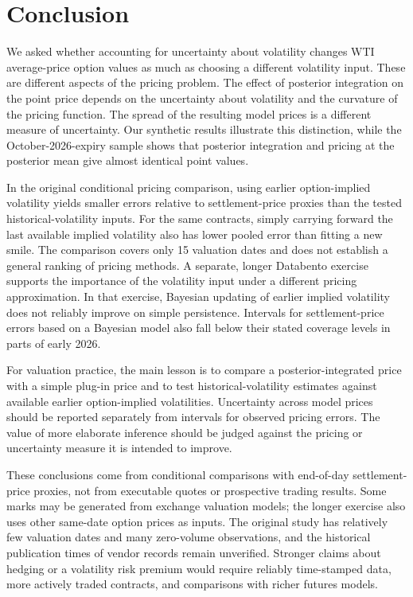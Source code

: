 \section{Conclusion}\label{sec:short_conclusion}

We asked whether accounting for uncertainty about volatility changes
WTI average-price option values as much as choosing a different
volatility input. These are different aspects of the pricing problem. The effect of posterior integration on the point price
depends on the uncertainty about volatility and the curvature
of the pricing function. The spread of
the resulting model prices is a different measure of uncertainty.
Our synthetic results illustrate this distinction, while the
October-2026-expiry sample shows that posterior integration and
pricing at the posterior mean give almost identical point values.

In the original conditional pricing comparison, using earlier
option-implied volatility yields smaller errors relative to
settlement-price proxies than the tested historical-volatility inputs. For the same
contracts, simply carrying forward the last available implied
volatility also has lower pooled error than fitting a new smile.
The comparison covers only 15 valuation dates and does not
establish a general ranking of pricing methods. A separate, longer Databento
exercise supports the importance of the volatility input under
a different pricing approximation. In that exercise, Bayesian
updating of earlier implied volatility does not reliably improve
on simple persistence. Intervals for settlement-price errors based on a Bayesian
model also fall below their stated coverage levels in parts
of early 2026.

For valuation practice, the main lesson is to compare a
posterior-integrated price with a simple plug-in price and to
test historical-volatility estimates against available earlier
option-implied volatilities. Uncertainty across model prices
should be reported separately from intervals for observed
pricing errors. The value of more elaborate inference should be judged
against the pricing or uncertainty measure it is intended
to improve.

These conclusions come from conditional comparisons with
end-of-day settlement-price proxies, not from executable
quotes or prospective trading results. Some marks may be generated
from exchange valuation models; the longer exercise also uses
other same-date option prices as inputs. The original study
has relatively few valuation dates and many zero-volume
observations, and the historical publication times of vendor
records remain unverified. Stronger claims about hedging or a volatility risk premium
would require reliably time-stamped data, more actively traded
contracts, and comparisons with richer futures models.
